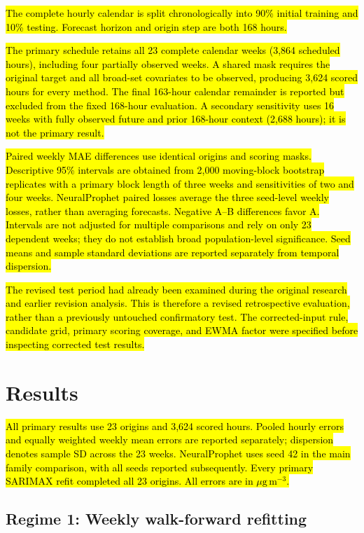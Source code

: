 \documentclass[pdflatex,sn-basic,Numbered]{sn-jnl}
\newcommand{\rev}[1]{\hl{#1}}
\newcommand{\PMunit}{\ensuremath{\mu\mathrm{g}\,\mathrm{m}^{-3}}}
\begin{document}
\rev{The complete hourly calendar is split chronologically into 90\% initial training and 10\% testing. Forecast horizon and origin step are both 168 hours.}

\rev{The primary schedule retains all 23 complete calendar weeks (3,864 scheduled hours), including four partially observed weeks. A shared mask requires the original target and all broad-set covariates to be observed, producing 3,624 scored hours for every method. The final 163-hour calendar remainder is reported but excluded from the fixed 168-hour evaluation. A secondary sensitivity uses 16 weeks with fully observed future and prior 168-hour context (2,688 hours); it is not the primary result.}

\rev{Paired weekly MAE differences use identical origins and scoring masks. Descriptive 95\% intervals are obtained from 2,000 moving-block bootstrap replicates with a primary block length of three weeks and sensitivities of two and four weeks. NeuralProphet paired losses average the three seed-level weekly losses, rather than averaging forecasts. Negative A--B differences favor A. Intervals are not adjusted for multiple comparisons and rely on only 23 dependent weeks; they do not establish broad population-level significance. Seed means and sample standard deviations are reported separately from temporal dispersion.}

\rev{The revised test period had already been examined during the original research and earlier revision analysis. This is therefore a revised retrospective evaluation, rather than a previously untouched confirmatory test. The corrected-input rule, candidate grid, primary scoring coverage, and EWMA factor were specified before inspecting corrected test results.}

\section{Results}\label{sec:results}

\rev{All primary results use 23 origins and 3,624 scored hours. Pooled hourly errors and equally weighted weekly mean errors are reported separately; dispersion denotes sample SD across the 23 weeks. NeuralProphet uses seed 42 in the main family comparison, with all seeds reported subsequently. Every primary SARIMAX refit completed all 23 origins. All errors are in \PMunit{}.}

\subsection{Regime 1: Weekly walk-forward refitting}\label{subsec:results_regime1}
\end{document}
